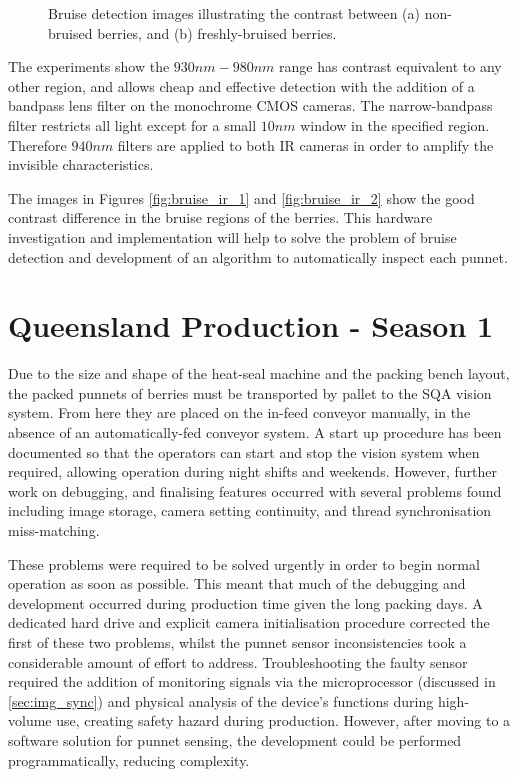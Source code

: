 \documentclass[fleqn,twoside,12pt]{report}
\begin{document}
\begin{figure}[h]
	\caption{Bruise detection images illustrating the contrast between (a) non-bruised berries, and (b) freshly-bruised berries.}
	\label{}
\end{figure}


The experiments show the $930nm-980nm$ range has contrast equivalent to any other region, and allows cheap and effective detection with the addition of a bandpass lens filter on the monochrome CMOS cameras. The narrow-bandpass filter restricts all light except for a small $10nm$ window in the specified region. Therefore $940nm$ filters are applied to both IR cameras in order to amplify the invisible characteristics. 


The images in Figures \ref{fig:bruise_ir_1} and \ref{fig:bruise_ir_2} show the good contrast difference in the bruise regions of the berries. This hardware investigation and implementation will help to solve the problem of bruise detection and development of an algorithm to automatically inspect each punnet.


\section{Queensland Production - Season 1}

Due to the size and shape of the heat-seal machine and the packing bench layout, the packed punnets of berries must be transported by pallet to the SQA vision system. From here they are placed on the in-feed conveyor manually, in the absence of an automatically-fed conveyor system. A start up procedure has been documented so that the operators can start and stop the vision system when required, allowing operation during night shifts and weekends. However, further work on debugging, and finalising features occurred with several problems found including image storage, camera setting continuity, and thread synchronisation miss-matching. 

These problems were required to be solved urgently in order to begin normal operation as soon as possible. This meant that much of the debugging and development occurred during production time given the long packing days. A dedicated hard drive and explicit camera initialisation procedure corrected the first of these two problems, whilst the punnet sensor inconsistencies took a considerable amount of effort to address. Troubleshooting the faulty sensor required the addition of monitoring signals via the microprocessor (discussed in \ref{sec:img_sync}) and physical analysis of the device's functions during high-volume use, creating safety hazard during production. However, after moving to a software solution for punnet sensing, the development could be performed programmatically, reducing complexity.
\end{document}
